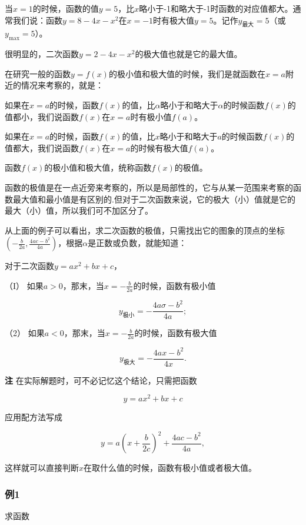 当\(x = 1\)的时候，函数的值\(y = 5\)，比\(x\)略小于-1和略大于-1时函数的对应值都大。通常我们说：函数\(y = 8 - 4x - x^2\)在\(x = -1\)时有极大值\(y = 5\)。记作\(y_{\text{最大}} = 5\)（或\(y_{\text{max}} = 5\)）。

很明显的，二次函数\(y=2-4x-x^{2}\)的极大值也就是它的最大值。

在研究一般的函数\(y = f(x)\)的极小值和极大值的时候，我们是就函数在\(x = a\)附近的情况来考察的，就是：

如果在\(x = a\)的时候，函数\(f(x)\)的值，比\(\alpha\)略小于和略大于\(\alpha\)的时候函数\(f(x)\)的值都小，我们说函数\(f(x)\)在\(x = a\)时有极小值\(f(a)\)。

如果在\(x = a\)的时候，函数\(f(x)\)的值，比\(x\)略小于和略大于\(a\)的时候函数\(f(x)\)的值都大，我们说函数\(f(x)\)在\(x = a\)的时候有极大值\(f(a)\)。

 函数\(f(x)\)的极小值和极大值，统称函数\(f(x)\)的极值。

函数的极值是在一点近旁来考察的，所以是局部性的，它与从某一范围来考察的函数最大值和最小值是有区别的.但对于二次函数来说，它的极大（小）值就是它的最大（小）值，所以我们可不加区分了。

从上面的例子可以看出，求二次函数的极值，只需找出它的图象的顶点的坐标\(\left(-\frac{b}{2a}, \frac{4ac - b^2}{4a}\right)\)，根据\(\alpha\)是正数或负数，就能知道：

对于二次函数\(y = ax^2 + bx + c\)，

（I） 如果\(a > 0\)，那末，当\(x = -\frac{b}{2a}\)的时候，函数有极小值

\[
y_{\text{极小}} = - \frac{4 a \sigma - b^{2}}{4 a};
\]

（2） 如果\(a < 0\)，那末，当\(x = -\frac{b}{2a}\)的时候，函数有极大值

\[
y_{\text{极大}} = - \frac{4 a x - b^{2}}{4 x}.
\]

\textbf{注} 在实际解题时，可不必记忆这个结论，只需把函数

\[
y = a x^{2} + b x + c
\]

应用配方法写成

\[
y = a \left(x + \frac{b}{2 c}\right)^{2} + \frac{4 a c - b^{2}}{4 a},
\]

这样就可以直接判断\(x\)在取什么值的时候，函数有极小值或者极大值。

\subsubsection{例1}

求函数

